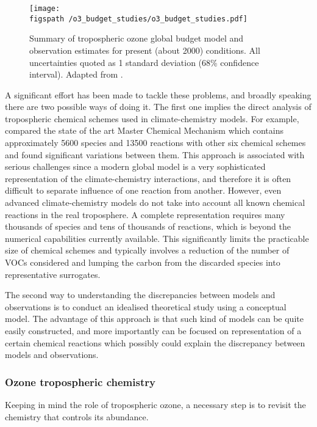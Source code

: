 \documentclass[11pt,a4paper]{article}
\newcommand{\figspath}{figures/}
\begin{document}
\begin{figure}[t]
\centering
\texttt{[image: \\figspath /o3\_budget\_studies/o3\_budget\_studies.pdf]}
\caption{Summary of tropospheric ozone global budget model and observation estimates for present (about 2000) conditions. All uncertainties quoted as 1 standard deviation (68\% confidence interval). Adapted from \citep{Myhre2013}.}
\label{fig:o3_budget_studies}
\end{figure}

A significant effort has been made to tackle these problems, and broadly speaking there are two possible ways of doing it. The first one implies the direct analysis of tropospheric chemical schemes used in climate-chemistry models. For example, \cite{Emmerson2009} compared the state of the art Master Chemical Mechanism which contains approximately 5600 species and 13500 reactions \citep{Jenkin2002} with other six chemical schemes and found significant variations between them. This approach is associated with serious challenges since a modern global model is a very sophisticated representation of the climate-chemistry interactions, and therefore it is often difficult to separate influence of one reaction from another. However, even advanced climate-chemistry models do not take into account all known chemical reactions in the real troposphere. A complete representation requires many thousands of species and tens of thousands of reactions, which is beyond the numerical capabilities currently available. This significantly limits the practicable size of chemical schemes and typically involves a reduction of the number of VOCs considered and lumping the carbon from the discarded species into representative surrogates.

The second way to understanding the discrepancies between models and observations is to conduct an idealised theoretical study using a conceptual model. The advantage of this approach is that such kind of models can be quite easily constructed, and more importantly can be focused on representation of a certain chemical reactions which possibly could explain the discrepancy between models and observations.

\subsubsection*{Ozone tropospheric chemistry} \label{intro_O3chem}
Keeping in mind the role of tropospheric ozone, a necessary step is to revisit the chemistry that controls its abundance.
\end{document}
